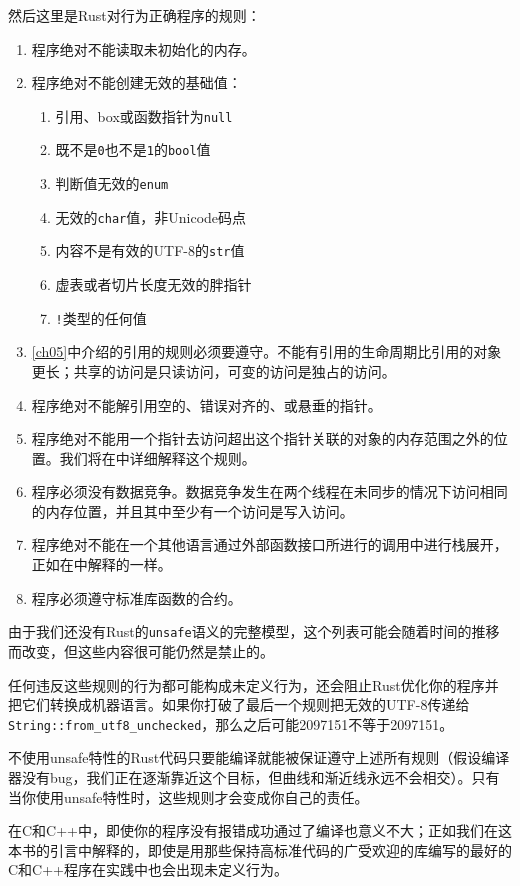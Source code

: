 然后这里是Rust对行为正确程序的规则：
\begin{enumerate}
    \item 程序绝对不能读取未初始化的内存。
    \item 程序绝对不能创建无效的基础值：
    \begin{enumerate}
        \item 引用、box或函数指针为\texttt{null}
        \item 既不是\texttt{0}也不是\texttt{1}的\texttt{bool}值
        \item 判断值无效的\texttt{enum}
        \item 无效的\texttt{char}值，非Unicode码点
        \item 内容不是有效的UTF-8的\texttt{str}值
        \item 虚表或者切片长度无效的胖指针
        \item \texttt{!}类型的任何值
    \end{enumerate}
    \item \autoref{ch05}中介绍的引用的规则必须要遵守。不能有引用的生命周期比引用的对象更长；共享的访问是只读访问，可变的访问是独占的访问。
    \item 程序绝对不能解引用空的、错误对齐的、或悬垂的指针。
    \item 程序绝对不能用一个指针去访问超出这个指针关联的对象的内存范围之外的位置。我们将在中详细解释这个规则。
    \item 程序必须没有数据竞争。数据竞争发生在两个线程在未同步的情况下访问相同的内存位置，并且其中至少有一个访问是写入访问。
    \item 程序绝对不能在一个其他语言通过外部函数接口所进行的调用中进行栈展开，正如在中解释的一样。
    \item 程序必须遵守标准库函数的合约。
\end{enumerate}

由于我们还没有Rust的\texttt{unsafe}语义的完整模型，这个列表可能会随着时间的推移而改变，但这些内容很可能仍然是禁止的。

任何违反这些规则的行为都可能构成未定义行为，还会阻止Rust优化你的程序并把它们转换成机器语言。如果你打破了最后一个规则把无效的UTF-8传递给\texttt{String::from\_utf8\_unchecked}，那么之后可能2097151不等于2097151。

不使用unsafe特性的Rust代码只要能编译就能被保证遵守上述所有规则（假设编译器没有bug，我们正在逐渐靠近这个目标，但曲线和渐近线永远不会相交）。只有当你使用unsafe特性时，这些规则才会变成你自己的责任。

在C和C++中，即使你的程序没有报错成功通过了编译也意义不大；正如我们在这本书的引言中解释的，即使是用那些保持高标准代码的广受欢迎的库编写的最好的C和C++程序在实践中也会出现未定义行为。

